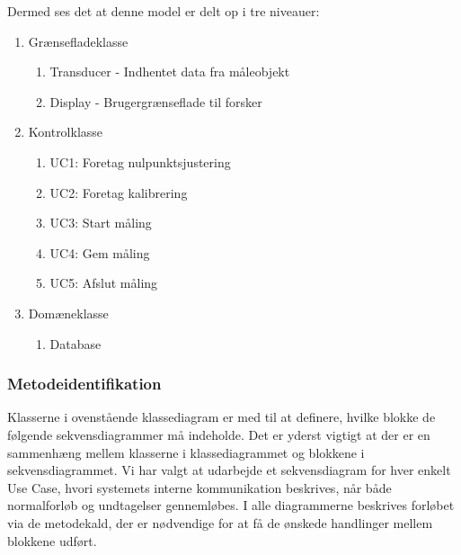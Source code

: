 Dermed ses det at denne model er delt op i tre niveauer:
\begin{enumerate}
\item Grænsefladeklasse
\begin{enumerate}
\item Transducer - Indhentet data fra måleobjekt
\item Display - Brugergrænseflade til forsker
\end{enumerate}
\item Kontrolklasse
\begin{enumerate}
\item UC1: Foretag nulpunktsjustering
\item UC2: Foretag kalibrering
\item UC3: Start måling
\item UC4: Gem måling
\item UC5: Afslut måling
\end{enumerate}
\item Domæneklasse
\begin{enumerate}
\item Database
\end{enumerate}
\end{enumerate}

\subsubsection{Metodeidentifikation}
Klasserne i ovenstående klassediagram er med til at definere, hvilke blokke de følgende sekvensdiagrammer må indeholde. Det er yderst vigtigt at der er en sammenhæng mellem klasserne i klassediagrammet og blokkene i sekvensdiagrammet. Vi har valgt at udarbejde et sekvensdiagram for hver enkelt Use Case, hvori systemets interne kommunikation beskrives, når både normalforløb og undtagelser gennemløbes. I alle diagrammerne beskrives forløbet via de metodekald, der er nødvendige for at få de ønskede handlinger mellem blokkene udført. 

